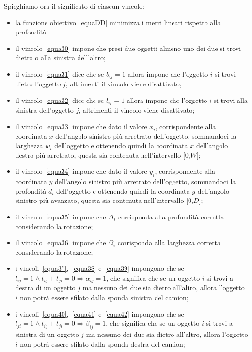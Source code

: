 \newpage
Spieghiamo ora il significato di ciascun vincolo:
\begin{itemize}
	\item la funzione obiettivo~\eqref{equaDD} minimizza i metri lineari rispetto alla profondità;
	\item il vincolo~\eqref{equa30} impone che presi due oggetti almeno uno dei due si trovi dietro o alla sinistra dell'altro;
	\item il vincolo~\eqref{equa31} dice che se $b_{ij} = 1$ allora impone che l'oggetto $i$ si trovi dietro l'oggetto $j$, altrimenti il vincolo viene disattivato;
	\item il vincolo~\eqref{equa32} dice che se $l_{ij} = 1$ allora impone che l'oggetto $i$ si trovi alla sinistra dell'oggetto $j$, altrimenti il vincolo viene disattivato;
	\item il vincolo~\eqref{equa33} impone che dato il valore $x_i$, corrispondente alla coordinata $x$ dell'angolo sinistro più arretrato dell'oggetto, sommandoci la larghezza $w_i$ dell'oggetto e ottenendo quindi la coordinata $x$ dell'angolo destro più arretrato, questa sia contenuta nell'intervallo [0,$W$];
	\item il vincolo~\eqref{equa34} impone che dato il valore $y_i$, corrispondente alla coordinata $y$ dell'angolo sinistro più arretrato dell'oggetto, sommandoci la profondità $d_i$ dell'oggetto e ottenendo quindi la coordinata $y$ dell'angolo sinistro più avanzato, questa sia contenuta nell'intervallo [0,$D$];
	\item il vincolo~\eqref{equa35} impone che $\Delta_i$ corrisponda alla profondità corretta considerando la rotazione;
	\item il vincolo~\eqref{equa36} impone che $\Omega_i$ corrisponda alla larghezza corretta considerando la rotazione;
	\item i vincoli~\eqref{equa37},~\eqref{equa38} e~\eqref{equa39} impongono che se $l_{ij} = 1 \land t_{ij} + t_{ji} = 0 \Rightarrow \alpha_{ij} = 1$, che significa che se un oggetto $i$ si trovi a destra di un oggetto $j$ ma nessuno dei due sia dietro all'altro, allora l'oggetto $i$ non potrà essere sfilato dalla sponda sinistra del camion;
	\item i vincoli~\eqref{equa40},~\eqref{equa41} e~\eqref{equa42} impongono che se $l_{ji} = 1 \land t_{ij} + t_{ji} = 0 \Rightarrow \beta_{ij} = 1$, che significa che se un oggetto $i$ si trovi a sinistra di un oggetto $j$ ma nessuno dei due sia dietro all'altro, allora l'oggetto $i$ non potrà essere sfilato dalla sponda destra del camion;

\end{itemize}
